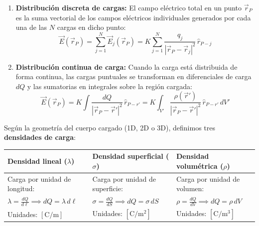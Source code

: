 \begin{ley}
\begin{enumerate}[leftmargin=*]
    \item \textbf{Distribución discreta de cargas:} El campo eléctrico total en un punto $\vec{r}_P$ es la suma vectorial de los campos eléctricos individuales generados por cada una de las $N$ cargas en dicho punto:
    \begin{equation}
        \vec{E}(\vec{r}_P) = \sum_{j=1}^N \vec{E}_j(\vec{r}_P) = K \sum_{j=1}^N \frac{q_j}{|\vec{r}_P - \vec{r}_j|^2}\, \hat{r}_{P-j}
    \end{equation}
    \item \textbf{Distribución continua de carga:} Cuando la carga está distribuida de forma continua, las cargas puntuales se transforman en diferenciales de carga $dQ$ y las sumatorias en integrales sobre la región cargada:
    \begin{equation}
        \vec{E}(\vec{r}_P) = K \int \frac{dQ}{|\vec{r}_P - \vec{r}'|^2}\, \hat{r}_{P-r'} = K \int_{V'} \frac{\rho(\vec{r}')}{|\vec{r}_P - \vec{r}'|^2}\, \hat{r}_{P-r'}\, dV'
    \end{equation}
\end{enumerate}
Según la geometría del cuerpo cargado (1D, 2D o 3D), definimos tres \textbf{densidades de carga}:
\begin{center}
\renewcommand{\arraystretch}{1.4}
\begin{tabular}{|p{}|p{}|p{}|}
\hline
\rowcolor{fftGray}
\textbf{Densidad lineal ($\lambda$)} & \textbf{Densidad superficial ($\sigma$)} & \textbf{Densidad volumétrica ($\rho$)} \\
\hline
Carga por unidad de longitud: & Carga por unidad de superficie: & Carga por unidad de volumen: \\
$\displaystyle \lambda = \frac{dQ}{d\ell} \implies dQ = \lambda\, d\ell$ & $\displaystyle \sigma = \frac{dQ}{dS} \implies dQ = \sigma\, dS$ & $\displaystyle \rho = \frac{dQ}{dV} \implies dQ = \rho\, dV$ \\
Unidades: $[\si{\coulomb\per\meter}]$ & Unidades: $[\si{\coulomb\per\meter\squared}]$ & Unidades: $[\si{\coulomb\per\meter\cubed}]$ \\
\hline
\end{tabular}
\end{center}
\end{ley}

